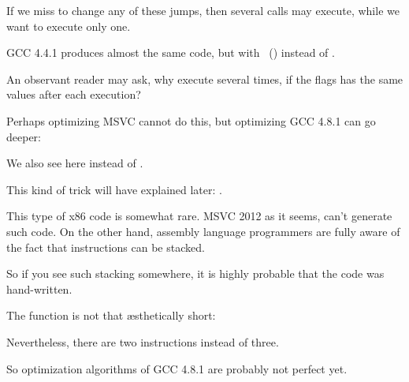 If we miss to change any of these jumps, then several \printf calls may execute, while we want to execute only one.


\NonOptimizing GCC 4.4.1 
produces almost the same code, but with \puts~() instead of \printf.


An observant reader may ask, why execute \CMP several times, 
if the flags has the same values after each execution?

Perhaps optimizing MSVC cannot do this, but optimizing GCC 4.8.1 can go deeper:



We also see  here instead of .

This kind of trick will have explained later: .

This type of x86 code 
is somewhat rare.
MSVC 2012 as it seems, can't generate such code.
On the other hand, assembly language programmers are fully aware of the fact that  
instructions can be stacked.

So if you see such stacking somewhere, it is highly probable that the code was hand-written.

The  function is not that 
\ae{}sthetically short:



Nevertheless, there are two  instructions instead of three.

So optimization algorithms of GCC 4.8.1 are probably not perfect yet. 
